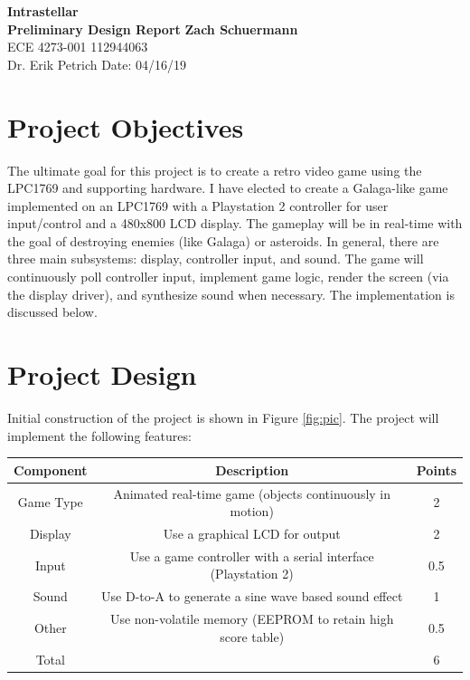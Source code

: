 \documentclass[a4paper, 12pt]{article}
\begin{document}
\noindent
\LARGE\textbf{Intrastellar} \hfill \\
\newline
\large\textbf{Preliminary Design Report} \hfill \textbf{Zach Schuermann} \\
\normalsize ECE 4273-001 \hfill 112944063 \\
Dr. Erik Petrich \hfill Date: 04/16/19 

\section*{Project Objectives}
The ultimate goal for this project is to create a retro video game using the LPC1769 and supporting hardware. I have elected to create a Galaga-like game implemented on an LPC1769 with a Playstation 2 controller for user input/control and a 480x800 LCD display. The gameplay will be in real-time with the goal of destroying enemies (like Galaga) or asteroids. In general, there are three main subsystems: display, controller input, and sound. The game will continuously poll controller input, implement game logic, render the screen (via the display driver), and synthesize sound when necessary. The implementation is discussed below. 

\section*{Project Design}
Initial construction of the project is shown in Figure \ref{fig:pic}. The project will implement the following features:

\begin{center}
  \begin{tabular}{ |c|c|c| }
    \hline
    \textbf{Component} & \textbf{Description} & \textbf{Points} \\
    \hline
    \hline
    Game Type & Animated real-time game (objects continuously in motion) & 2 \\
    \hline
    Display & Use a graphical LCD for output  & 2 \\
    \hline
    Input & Use a game controller with a serial interface (Playstation 2) & 0.5 \\ 
    \hline
    Sound & Use D-to-A to generate a sine wave based sound effect  & 1 \\
    \hline
    Other & Use non-volatile memory (EEPROM  to retain high score table) & 0.5 \\ 
    \hline
    Total & & 6 \\ 
    \hline
  \end{tabular}
\end{center}
\end{document}
